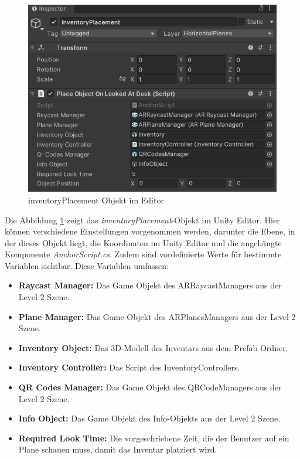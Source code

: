 \begin{figure}[h]
    \centering
    \includegraphics[scale=0.8]{images/invPlace_Editor}
    \caption{inventoryPlacement Objekt im Editor}
    \label{fig:inventoryPlacement_Editor}
\end{figure}

Die Abbildung \ref{fig:inventoryPlacement_Editor} zeigt das \textit{inventoryPlacement}-Objekt im Unity Editor. Hier
können verschiedene Einstellungen vorgenommen werden, darunter die Ebene, in der dieses Objekt liegt, die Koordinaten
im Unity Editor und die angehängte Komponente \textit{AnchorScript.cs}. Zudem sind vordefinierte Werte für bestimmte
Variablen sichtbar. Diese Variablen umfassen:

\begin{itemize}
    \item \textbf{Raycast Manager:} Das Game Objekt des ARRaycastManagers aus der Level 2 Szene.
    \item \textbf{Plane Manager:} Das Game Objekt des ARPlanesManagers aus der Level 2 Szene.
    \item \textbf{Inventory Object:} Das 3D-Modell des Inventars aus dem Prefab Ordner.
    \item \textbf{Inventory Controller:} Das Script des InventoryControllers.
    \item \textbf{QR Codes Manager:} Das Game Objekt des QRCodeManagers aus der Level 2 Szene.
    \item \textbf{Info Object:} Das Game Objekt des Info-Objekts aus der Level 2 Szene.
    \item \textbf{Required Look Time:} Die vorgeschriebene Zeit, die der Benutzer auf ein Plane schauen muss, damit das
    Inventar platziert wird.
\end{itemize}

